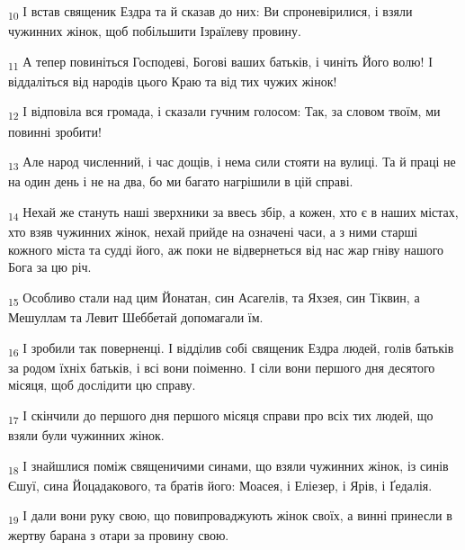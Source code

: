 \begin{tcolorbox}
\textsubscript{10} І встав священик Ездра та й сказав до них: Ви спроневірилися, і взяли чужинних жінок, щоб побільшити Ізраїлеву провину.
\end{tcolorbox}
\begin{tcolorbox}
\textsubscript{11} А тепер повиніться Господеві, Богові ваших батьків, і чиніть Його волю! І віддаліться від народів цього Краю та від тих чужих жінок!
\end{tcolorbox}
\begin{tcolorbox}
\textsubscript{12} І відповіла вся громада, і сказали гучним голосом: Так, за словом твоїм, ми повинні зробити!
\end{tcolorbox}
\begin{tcolorbox}
\textsubscript{13} Але народ численний, і час дощів, і нема сили стояти на вулиці. Та й праці не на один день і не на два, бо ми багато нагрішили в цій справі.
\end{tcolorbox}
\begin{tcolorbox}
\textsubscript{14} Нехай же стануть наші зверхники за ввесь збір, а кожен, хто є в наших містах, хто взяв чужинних жінок, нехай прийде на означені часи, а з ними старші кожного міста та судді його, аж поки не відвернеться від нас жар гніву нашого Бога за цю річ.
\end{tcolorbox}
\begin{tcolorbox}
\textsubscript{15} Особливо стали над цим Йонатан, син Асагелів, та Яхзея, син Тіквин, а Мешуллам та Левит Шеббетай допомагали їм.
\end{tcolorbox}
\begin{tcolorbox}
\textsubscript{16} І зробили так поверненці. І відділив собі священик Ездра людей, голів батьків за родом їхніх батьків, і всі вони поіменно. І сіли вони першого дня десятого місяця, щоб дослідити цю справу.
\end{tcolorbox}
\begin{tcolorbox}
\textsubscript{17} І скінчили до першого дня першого місяця справи про всіх тих людей, що взяли були чужинних жінок.
\end{tcolorbox}
\begin{tcolorbox}
\textsubscript{18} І знайшлися поміж священичими синами, що взяли чужинних жінок, із синів Єшуї, сина Йоцадакового, та братів його: Моасея, і Еліезер, і Ярів, і Ґедалія.
\end{tcolorbox}
\begin{tcolorbox}
\textsubscript{19} І дали вони руку свою, що повипроваджують жінок своїх, а винні принесли в жертву барана з отари за провину свою.
\end{tcolorbox}

